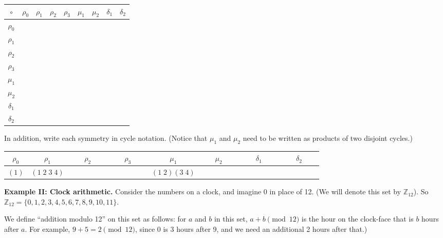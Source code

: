 \begin{enumerate}
    \begin{center}
  \renewcommand{\arraystretch}{1.7}
    \begin{tabular}{|c||c|c|c|c|c|c|c|c|} \hline
        $\circ$ & $\rho_0$ & $\rho_1$ & $\rho_2$ & $\rho_3$ & $\mu_1$ & $\mu_2$ & $\delta_1$ & $\delta_2$ \\ \hline \hline
        $\rho_0$ & & & & & & & &   \\ \hline
        $\rho_1$ & & & & & & & &  \\ \hline
        $\rho_2$ & & & & & & & &  \\ \hline
        $\rho_3$ & & & & & & & &  \\ \hline
        $\mu_1$ & & & & & &  & & \\ \hline
        $\mu_2$ & & & & & &  & & \\ \hline
        $\delta_1$ & & & & & &  & & \\ \hline
        $\delta_2$ & & & & & &  & & \\ \hline
    \end{tabular}
    \end{center}
    In addition, write each symmetry in cycle notation. (Notice that $\mu_1$ and $\mu_2$ need to be written as products of two disjoint cycles.)
    \begin{center}
   \renewcommand{\arraystretch}{1.7}
    \begin{tabular}{|c|c|c|c|c|c|c|c|} \hline
         $\rho_0$ & $\rho_1$ & $\rho_2$ & $\rho_3$ & $\mu_1$ & $\mu_2$ & $\delta_1$ & $\delta_2$ \\ \hline
         $(1)$ & $(1\; 2\; 3 \; 4)$ & $\phantom{(1\; 2\; 3\; 4)}$
         & $\phantom{(1\; 2\; 3\; 4)}$
         & $(1\; 2)( 3\; 4)$ & $\phantom{(1\; 2\; 3\; 4)}$ & $\phantom{(1\; 2\; 3\; 4)}$
         & $\phantom{(1\; 2\; 3\; 4)}$ \\ \hline
    \end{tabular}
    \end{center}
\end{enumerate}

\clearpage

\textbf{Example II: Clock arithmetic.} Consider the numbers on a clock, and imagine 0 in place of 12. (We will denote this set by $\mathbb{Z}_{12}$). So $\mathbb{Z}_{12} = \{0,1,2,3,4,5,6,7,8,9,10,11\}$.

We define ``addition modulo 12'' on this set as follows: for $a$ and $b$ in this set, $a + b \pmod{12}$ is the hour on the clock-face that is $b$ hours after $a$. For example, $9 + 5 = 2 \pmod{12}$, since 0 is 3 hours after 9, and we need an additional 2 hours after that.)

